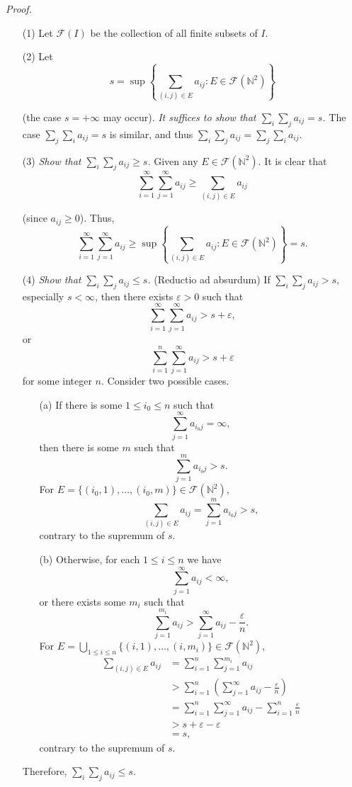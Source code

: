 \documentclass{article}
\begin{document}
\emph{Proof.}
\begin{enumerate}
\item[(1)]
Let $\mathscr{F}(I)$ be the collection of all finite subsets of $I$.

\item[(2)]
Let
\[
  s = \sup \left\{
    \sum_{(i,j) \in E} a_{ij} : E \in \mathscr{F}(\mathbb{N}^2)
  \right\}
\]

(the case $s = +\infty$ may occur).
\emph{It suffices to show that $\sum_{i}\sum_{j} a_{ij} = s$.}
The case $\sum_{j}\sum_{i} a_{ij} = s$ is similar, and thus
$\sum_{i}\sum_{j} a_{ij} = \sum_{j}\sum_{i} a_{ij}.$

\item[(3)]
\emph{Show that $\sum_{i}\sum_{j} a_{ij} \geq s$.}
Given any $E \in \mathscr{F}(\mathbb{N}^2)$.
It is clear that
\[
  \sum_{i=1}^{\infty}\sum_{j=1}^{\infty}a_{ij} \geq \sum_{(i,j) \in E} a_{ij}
\]

(since $a_{ij} \geq 0$).
Thus,
\[
  \sum_{i=1}^{\infty}\sum_{j=1}^{\infty}a_{ij}
  \geq
  \sup \left\{
    \sum_{(i,j) \in E} a_{ij} : E \in \mathscr{F}(\mathbb{N}^2)
  \right\}
  = s.
\]

\item[(4)]
\emph{Show that $\sum_{i}\sum_{j} a_{ij} \leq s$.}
(Reductio ad absurdum)
If $\sum_{i}\sum_{j} a_{ij} > s$,
especially $s < \infty$,
then there exists $\varepsilon > 0$ such that
\[
  \sum_{i=1}^{\infty} \sum_{j=1}^{\infty} a_{ij} > s + \varepsilon,
\]
or
\[
  \sum_{i=1}^{n} \sum_{j=1}^{\infty} a_{ij} > s + \varepsilon
\]
for some integer $n$.
Consider two possible cases.
  \begin{enumerate}
  \item[(a)]
  If there is some $1 \leq i_0 \leq n$
  such that
  \[
    \sum_{j=1}^{\infty} a_{i_0 j} = \infty,
  \]
  then there is some $m$ such that
  \[
    \sum_{j=1}^{m} a_{i_0 j} > s.
  \]
  For $E = \{ (i_0,1),\ldots,(i_0,m) \} \in \mathscr{F}(\mathbb{N}^2)$,
  \[
    \sum_{(i,j) \in E} a_{ij} = \sum_{j=1}^{m} a_{i_0 j} > s,
  \]
  contrary to the supremum of $s$.

  \item[(b)]
  Otherwise, for each  $1 \leq i \leq n$
  we have
  \[
    \sum_{j=1}^{\infty} a_{ij} < \infty,
  \]
  or there exists some $m_i$ such that
  \[
    \sum_{j=1}^{m_i} a_{ij} > \sum_{j=1}^{\infty} a_{ij} - \frac{\varepsilon}{n}.
  \]
  For $E = \bigcup_{1 \leq i \leq n} \{ (i,1),\ldots,(i,m_i) \} \in \mathscr{F}(\mathbb{N}^2)$,
  \begin{align*}
    \sum_{(i,j) \in E} a_{ij}
    &= \sum_{i=1}^{n} \sum_{j=1}^{m_i} a_{ij} \\
    &> \sum_{i=1}^{n} \left( \sum_{j=1}^{\infty} a_{ij} - \frac{\varepsilon}{n} \right) \\
    &= \sum_{i=1}^{n}\sum_{j=1}^{\infty} a_{ij} - \sum_{i=1}^{n}\frac{\varepsilon}{n} \\
    &> s + \varepsilon - \varepsilon \\
    &= s,
  \end{align*}
  contrary to the supremum of $s$.
  \end{enumerate}
  Therefore, $\sum_{i}\sum_{j} a_{ij} \leq s$.


\end{enumerate}
\end{document}
